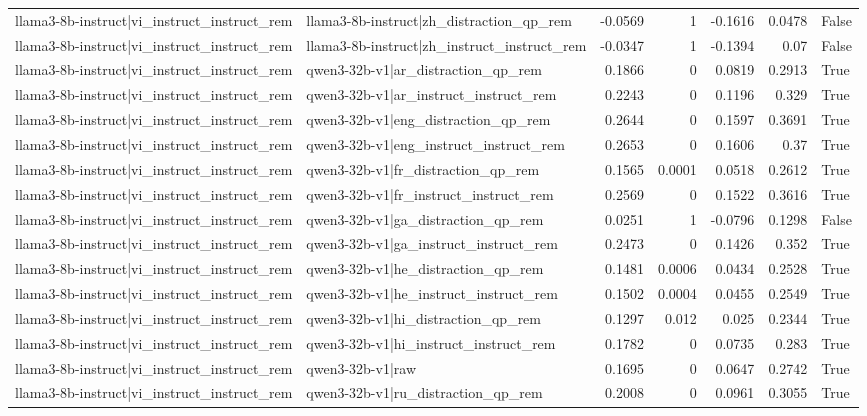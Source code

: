 \begin{table}
\begin{tabular}{l l r r r r l}
llama3-8b-instruct|vi_instruct_instruct_rem & llama3-8b-instruct|zh_distraction_qp_rem & -0.0569 & 1 & -0.1616 & 0.0478 & False \\
llama3-8b-instruct|vi_instruct_instruct_rem & llama3-8b-instruct|zh_instruct_instruct_rem & -0.0347 & 1 & -0.1394 & 0.07 & False \\
llama3-8b-instruct|vi_instruct_instruct_rem & qwen3-32b-v1|ar_distraction_qp_rem & 0.1866 & 0 & 0.0819 & 0.2913 & True \\
llama3-8b-instruct|vi_instruct_instruct_rem & qwen3-32b-v1|ar_instruct_instruct_rem & 0.2243 & 0 & 0.1196 & 0.329 & True \\
llama3-8b-instruct|vi_instruct_instruct_rem & qwen3-32b-v1|eng_distraction_qp_rem & 0.2644 & 0 & 0.1597 & 0.3691 & True \\
llama3-8b-instruct|vi_instruct_instruct_rem & qwen3-32b-v1|eng_instruct_instruct_rem & 0.2653 & 0 & 0.1606 & 0.37 & True \\
llama3-8b-instruct|vi_instruct_instruct_rem & qwen3-32b-v1|fr_distraction_qp_rem & 0.1565 & 0.0001 & 0.0518 & 0.2612 & True \\
llama3-8b-instruct|vi_instruct_instruct_rem & qwen3-32b-v1|fr_instruct_instruct_rem & 0.2569 & 0 & 0.1522 & 0.3616 & True \\
llama3-8b-instruct|vi_instruct_instruct_rem & qwen3-32b-v1|ga_distraction_qp_rem & 0.0251 & 1 & -0.0796 & 0.1298 & False \\
llama3-8b-instruct|vi_instruct_instruct_rem & qwen3-32b-v1|ga_instruct_instruct_rem & 0.2473 & 0 & 0.1426 & 0.352 & True \\
llama3-8b-instruct|vi_instruct_instruct_rem & qwen3-32b-v1|he_distraction_qp_rem & 0.1481 & 0.0006 & 0.0434 & 0.2528 & True \\
llama3-8b-instruct|vi_instruct_instruct_rem & qwen3-32b-v1|he_instruct_instruct_rem & 0.1502 & 0.0004 & 0.0455 & 0.2549 & True \\
llama3-8b-instruct|vi_instruct_instruct_rem & qwen3-32b-v1|hi_distraction_qp_rem & 0.1297 & 0.012 & 0.025 & 0.2344 & True \\
llama3-8b-instruct|vi_instruct_instruct_rem & qwen3-32b-v1|hi_instruct_instruct_rem & 0.1782 & 0 & 0.0735 & 0.283 & True \\
llama3-8b-instruct|vi_instruct_instruct_rem & qwen3-32b-v1|raw & 0.1695 & 0 & 0.0647 & 0.2742 & True \\
llama3-8b-instruct|vi_instruct_instruct_rem & qwen3-32b-v1|ru_distraction_qp_rem & 0.2008 & 0 & 0.0961 & 0.3055 & True \\

\end{tabular}
\end{table}
